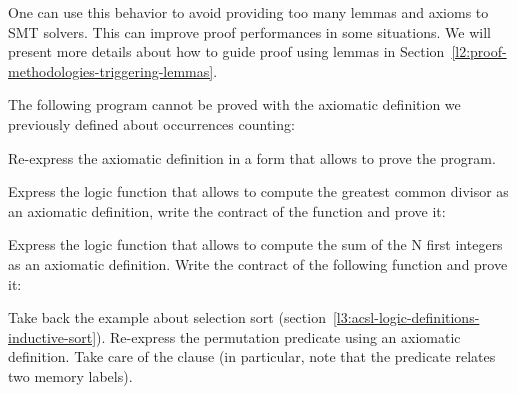 One can use this behavior to avoid providing too many lemmas and axioms to SMT
solvers. This can improve proof performances in some situations. We will present
more details about how to guide proof using lemmas in
Section~\ref{l2:proof-methodologies-triggering-lemmas}.






The following program cannot be proved with the axiomatic definition we
previously defined about occurrences counting:




Re-express the axiomatic definition in a form that allows to prove the
program.




Express the logic function that allows to compute the greatest common divisor as
an axiomatic definition, write the contract of the  function and
prove it:






Express the logic function that allows to compute the sum of the N first
integers as an axiomatic definition. Write the contract of the following
 function and prove it:






Take back the example about selection sort
(section~\ref{l3:acsl-logic-definitions-inductive-sort}). Re-express the
permutation predicate using an axiomatic definition. Take care of the
 clause (in particular, note that the predicate relates
two memory labels).


